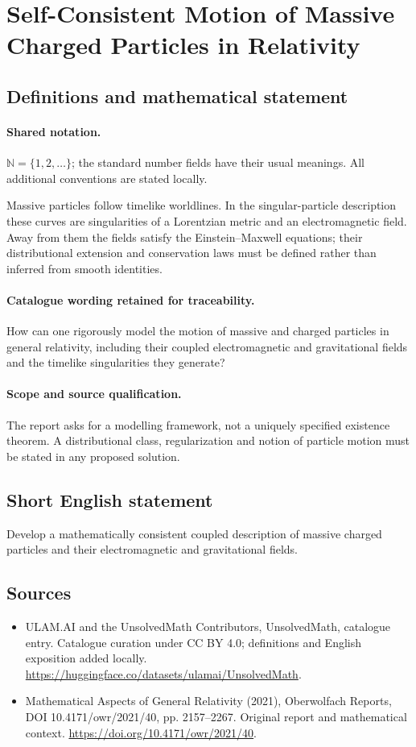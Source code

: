 \documentclass[11pt]{article}
\begin{document}
\section{Self-Consistent Motion of Massive Charged Particles in Relativity}\label{statement}

\subsection{Definitions and mathematical statement}

\paragraph{Shared notation.}$\mathbb N=\{1,2,\ldots\}$; the standard number fields have their usual meanings. All additional conventions are stated locally.


Massive particles follow timelike worldlines. In the singular-particle description these curves are singularities of a Lorentzian metric and an electromagnetic field. Away from them the fields satisfy the Einstein--Maxwell equations; their distributional extension and conservation laws must be defined rather than inferred from smooth identities.

\paragraph{Catalogue wording retained for traceability.}
How can one rigorously model the motion of massive and charged particles in general relativity, including their coupled electromagnetic and gravitational fields and the timelike singularities they generate?

\paragraph{Scope and source qualification.}The report asks for a modelling framework, not a uniquely specified existence theorem. A distributional class, regularization and notion of particle motion must be stated in any proposed solution.
\subsection{Short English statement}
Develop a mathematically consistent coupled description of massive charged particles and their electromagnetic and gravitational fields.
\subsection{Sources}
\begin{itemize}
\item[\hypertarget{source:statement:1}{S1}] ULAM.AI and the UnsolvedMath Contributors, UnsolvedMath, catalogue entry. Catalogue curation under CC BY 4.0; definitions and English exposition added locally.
\url{https://huggingface.co/datasets/ulamai/UnsolvedMath}.
\item[\hypertarget{source:statement:2}{S2}] Mathematical Aspects of General Relativity (2021), Oberwolfach Reports, DOI 10.4171/owr/2021/40, pp. 2157--2267. Original report and mathematical context.
\url{https://doi.org/10.4171/owr/2021/40}.
\end{itemize}
\label{end:statement}
\end{document}
